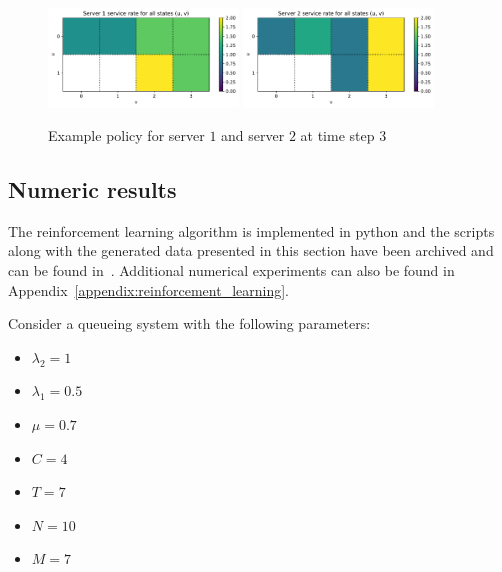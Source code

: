 \begin{figure}[H]
    \includegraphics[width=0.45\textwidth]{chapters/06_agent_based_extension/Bin/reinforcement_learning_policy_example/server_1_3.pdf}
    \includegraphics[width=0.45\textwidth]{chapters/06_agent_based_extension/Bin/reinforcement_learning_policy_example/server_2_3.pdf}
    \caption{Example policy for server \(1\) and server \(2\) at time step \(3\)}
    \label{fig:reinforcement_learning_policy_exmaple_3}
\end{figure}



\subsection{Numeric results}\label{sec:reiforcement_learning_numeric_results}

The reinforcement learning algorithm is implemented in python and the scripts
along with the generated data presented in this section have been archived and
can be found in~\cite{michalis_panayides_2023_7586860}.
Additional numerical experiments can also be found in
Appendix~\ref{appendix:reinforcement_learning}.

Consider a queueing system with the following parameters:

\begin{multicols}{4}
    \begin{itemize}
        \item \(\lambda_2 = 1\)
        \item \(\lambda_1 = 0.5 \)
        \item \(\mu = 0.7\)
        \item \(C = 4\)
        \item \(T = 7\)
        \item \(N = 10\)
        \item \(M = 7 \)
    \end{itemize}
\end{multicols}

